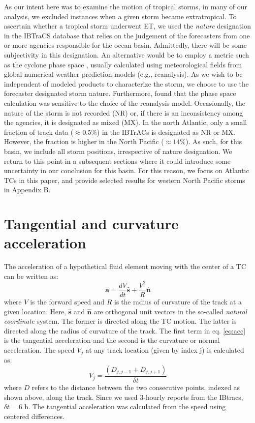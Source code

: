 \documentclass[wcd,manuscript]{copernicus}
\begin{document}
 As our intent here was to examine the motion of tropical storms, in many of our analysis, we excluded instances when a given storm became extratropical. To ascertain whether a tropical storm underwent ET, we used the \emph{nature} designation in the IBTraCS database that relies on the judgement of the forecasters from one or more agencies responsible for the ocean basin.  Admittedly, there will be some subjectivity in this designation. An alternative would be to employ a metric such as the cyclone phase space \citep{Hart2003}, usually calculated using meteorological fields from global numerical weather prediction models (e.g., reanalysis). As we wish to be independent of modeled products to characterize the storm, we choose to use the forecaster designated storm nature. Furthermore, \cite{BCSEH2019a} found that the phase space calculation was sensitive to the choice of the reanalysis model. Occasionally, the nature of the storm is not recorded (NR) or, if there is an inconsistency among the agencies, it is designated as mixed (MX). In the north Atlantic, only a small fraction of track data ($\approx 0.5\%$) in the IBTrACs is designated as NR or MX. However, the fraction is higher in the North Pacific ($\approx 14\%$). As such, for this basin, we include all storm positions, irrespective of nature designation. We return to this point in a subsequent sections where it could introduce some uncertainty in our conclusion for this basin. For this reason, we focus on Atlantic TCs in this paper, and provide selected results for western North Pacific storms in Appendix B.
 
 
\section{Tangential and curvature acceleration}
The acceleration of a hypothetical fluid element moving with the center of a TC can be written as:
%
\begin{equation}
    \mathbf{a} = \frac{dV}{dt} \mathbf{\hat{s}} + \frac{V^2}{R} \mathbf{\hat{n}} 
    \label{eq:acc}
\end{equation}
%
where $V$ is the forward speed and $R$ is the radius of curvature of the track at a given location. Here, $\mathbf{\hat{s}}$ and $\mathbf{\hat{n}}$ are orthogonal unit vectors in the so-called \emph{natural coordinate} system. The former is directed along the TC motion. The latter is directed along the radius of curvature of the track.  The first term in eq. \ref{eq:acc} is the tangential acceleration and the second is the curvature or normal acceleration. The speed $V_j$ at any track location (given by index j)  is calculated as:
%
\begin{equation}
V_j = \frac{(D_{j,j-1} +  D_{j,j+1})}{\delta t}
\end{equation}
%
where $D$ refers to the distance between the two consecutive points, indexed as shown above, along the track. Since we used 3-hourly reports from the IBtracs, $\delta t = 6$ h. The tangential acceleration was calculated from the speed using centered differences. 
\end{document}
